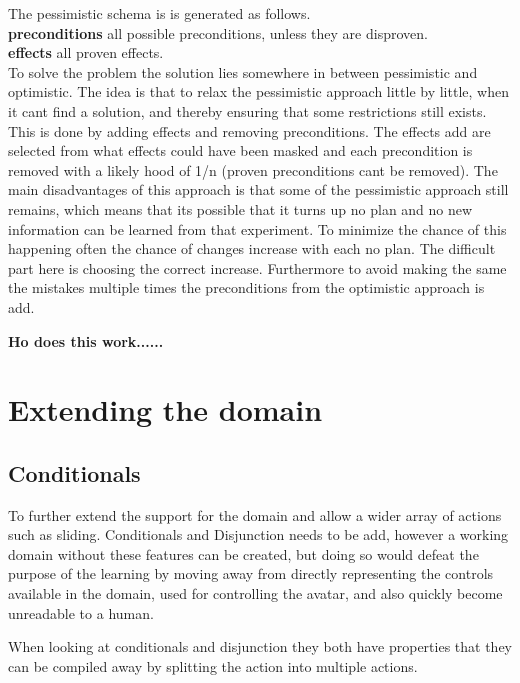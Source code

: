 The pessimistic schema is is generated as follows.\\
\textbf{preconditions}
all possible preconditions, unless they are disproven.\\
\textbf{effects}
all proven effects.\\

To solve the problem the solution lies somewhere in between pessimistic and optimistic. The idea is that to relax the pessimistic approach little by little, when it cant find a solution, and thereby ensuring that some restrictions still exists. This is done by adding effects and removing preconditions. The effects add are selected from what effects could have been masked and each precondition is removed with a likely hood of 1/n (proven preconditions cant be removed). The main disadvantages of this approach is that some of the pessimistic approach still remains, which means that its possible that it turns up no plan and no new information can be learned from that experiment. To minimize the chance of this happening often the chance of changes increase with each no plan. The difficult part here is choosing the correct increase. Furthermore to avoid making the same the mistakes multiple times the preconditions from the optimistic approach is add.  
 
 
 \textbf{\huge Ho does this work......}

\section{Extending the domain}
\subsection{Conditionals}	

	To further extend the support for the domain and allow a wider array of actions such as sliding. Conditionals and Disjunction needs to be add, however a working domain without these features can be created, but doing so would defeat the purpose of the learning by moving away from directly representing the controls available in the domain, used for controlling the avatar, and also quickly become unreadable to a human. 

	When looking at conditionals and disjunction they both have properties that they can be compiled away by splitting the action into multiple actions. %
	
